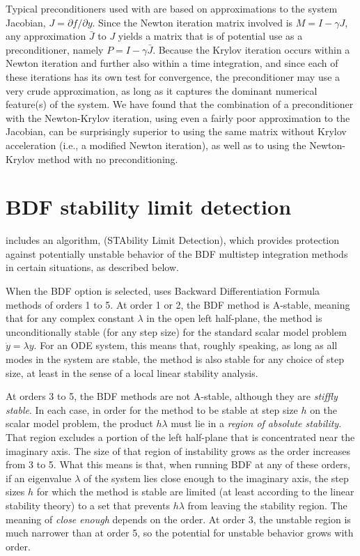 Typical preconditioners used with {\cvode} are based on approximations
to the system Jacobian, $J = \partial f / \partial y$.  Since the
Newton iteration matrix involved is $M = I - \gamma J$, any
approximation $\bar{J}$ to $J$ yields a matrix that is of potential
use as a preconditioner, namely $P = I - \gamma \bar{J}$.  Because the
Krylov iteration occurs within a Newton iteration and further also
within a time integration, and since each of these iterations has its
own test for convergence, the preconditioner may use a very crude
approximation, as long as it captures the dominant numerical
feature(s) of the system.  We have found that the combination of a
preconditioner with the Newton-Krylov iteration, using even a fairly
poor approximation to the Jacobian, can be surprisingly superior to
using the same matrix without Krylov acceleration (i.e., a modified
Newton iteration), as well as to using the Newton-Krylov method with
no preconditioning.  

\section{BDF stability limit detection}\label{s:bdf_stab}

{\cvode} includes an algorithm, {\stald} (STAbility Limit Detection),
which provides protection against potentially unstable behavior of the 
BDF multistep integration methods in certain situations, as described below.

When the BDF option is selected, {\cvode} uses Backward Differentiation 
Formula methods of orders 1 to 5.  At order 1 or 2, the BDF
method is A-stable, meaning that for any complex constant $\lambda$ in
the open left half-plane, the method is unconditionally stable (for
any step size) for the standard scalar model problem $\dot{y} = \lambda y$.
For an ODE system, this means that, roughly speaking, as long as all
modes in the system are stable, the method is also stable for any
choice of step size, at least in the sense of a local linear stability
analysis.

At orders 3 to 5, the BDF methods are not A-stable, although they are
{\em stiffly stable}. In each case, in order for the method to be stable
at step size $h$ on the scalar model problem, the product $h\lambda$ must
lie in a {\em region of absolute stability}. 
That region excludes a portion of the left half-plane that is concentrated 
near the imaginary axis.  The size of that region of instability grows as the order
increases from 3 to 5.  What this means is that, when running BDF at
any of these orders, if an eigenvalue $\lambda$ of the system lies close
enough to the imaginary axis, the step sizes $h$ for which the method is
stable are limited (at least according to the linear stability theory)
to a set that prevents $h\lambda$ from leaving the stability region.
The meaning of {\em close enough} depends on the order.  
At order 3, the unstable region is much narrower than at order 5, 
so the potential for unstable behavior grows with order.


